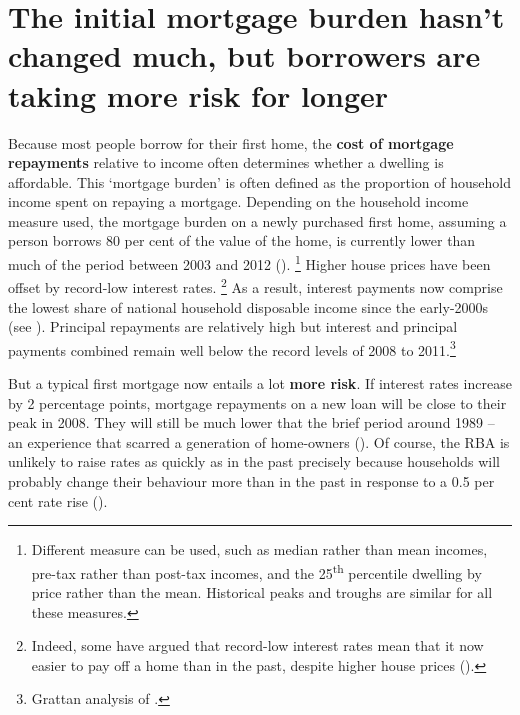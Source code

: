 \section{The initial mortgage burden hasn't changed much, but borrowers are taking more risk for longer}\label{sec:the-initial-mortgage-burden-hasnt-changed-much-but-borrowers-are-taking-more-risk-for-longer}

Because most people borrow for their first home, the \textbf{cost of mortgage repayments} relative to income often determines whether a dwelling is affordable.
This `mortgage burden' is often defined as the proportion of household income spent on repaying a mortgage.
Depending on the household income measure used, the mortgage burden on a newly purchased first home, assuming a person borrows 80 per cent of the value of the home, is currently lower than much of the period between 2003 and 2012 ().%
	\footnote{\textcite{CoreLogic2016-affordability}
Different measure can be used, such as median rather than mean incomes, pre-tax rather than post-tax incomes, and the 25\textsuperscript{th} percentile dwelling by price rather than the mean.
Historical peaks and troughs are similar for all these measures.}
Higher house prices have been offset by record-low interest rates.%
	\footnote{Indeed, some have argued that record-low interest rates mean that it now easier to pay off a home than in the past, despite higher house prices (\textcites{Sloan-housing-affordability}{Koukoulas-2016-millennials}).}
As a result, interest payments now comprise the lowest share of national household disposable income since the early-2000s (see ). Principal repayments are relatively high but interest and principal payments combined remain well below the record levels of 2008 to 2011.\footnote{Grattan analysis of \textcites[][Graph 10]{Lowe2017SomeEvolvingQuestions}{Bullock_2018_Household_Indebtednes}.}

But a typical first mortgage now entails a lot \textbf{more risk}.
If interest rates increase by 2 percentage points, mortgage repayments on a new loan will be close to their peak in 2008. They will still be much lower that the brief period around 1989 -- an experience that scarred a generation of home-owners (). Of course, the RBA is unlikely to raise rates as quickly as in the past precisely because households will probably change their behaviour more than in the past in response to a 0.5 per cent rate rise ().


